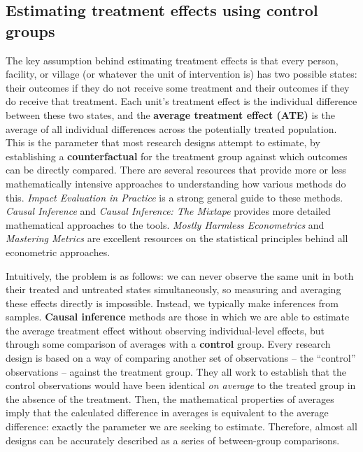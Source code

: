 \subsection{Estimating treatment effects using control groups}

The key assumption behind estimating treatment effects is that every
person, facility, or village (or whatever the unit of intervention is)
has two possible states: their outcomes if they do not receive some treatment
and their outcomes if they do receive that treatment.
Each unit's treatment effect is the individual difference between these two states,
and the \textbf{average treatment effect (ATE)} is the average of all
individual differences across the potentially treated population.
This is the parameter that most research designs attempt to estimate,
by establishing a \textbf{counterfactual}
for the treatment group against which outcomes can be directly compared.
There are several resources that provide more or less mathematically intensive
approaches to understanding how various methods do this.
\textit{Impact Evaluation in Practice} \citep{gertler2016impact} 
is a strong general guide to these methods.
\textit{Causal Inference} \citep{hernan2010causal} and 
\textit{Causal Inference: The Mixtape} \citep{cunningham2018causal}
provides more detailed mathematical approaches to the tools.
\textit{Mostly Harmless Econometrics} \citep{angrist2008mostly}
and \textit{Mastering Metrics} \citep{angrist2014mastering}
are excellent resources on the statistical principles behind all econometric approaches.

Intuitively, the problem is as follows: we can never observe the same unit
in both their treated and untreated states simultaneously,
so measuring and averaging these effects directly is impossible.\cite{rubin2003basic}
Instead, we typically make inferences from samples.
\textbf{Causal inference} methods are those in which we are able to estimate the
average treatment effect without observing individual-level effects,
but through some comparison of averages with a \textbf{control} group.
Every research design is based on a way of comparing another set of observations --
the ``control'' observations -- against the treatment group.
They all work to establish that the control observations would have been
identical \textit{on average} to the treated group in the absence of the treatment.
Then, the mathematical properties of averages imply that the calculated
difference in averages is equivalent to the average difference:
exactly the parameter we are seeking to estimate.
Therefore, almost all designs can be accurately described
as a series of between-group comparisons.


